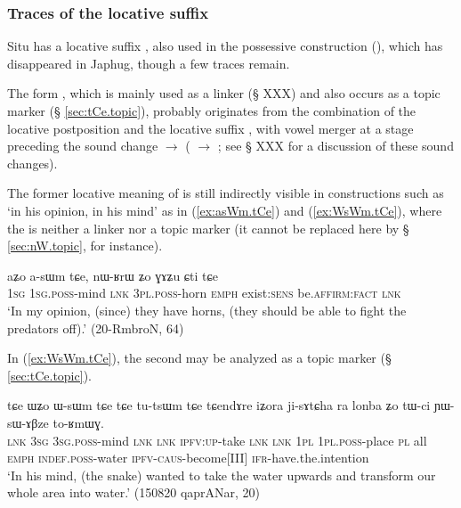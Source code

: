 \subsubsection{Traces of the locative suffix } \label{sec:locative.j}
Situ has a locative suffix , also used in the possessive construction (\citealt[325-330]{linxr93jiarongen}), which has disappeared in Japhug, though a few traces remain.


The form , which is mainly used as a linker (§ XXX) and also occurs as a topic marker (§ \ref{sec:tCe.topic}), probably originates from the combination of the locative postposition  and the locative suffix , with vowel merger at a stage preceding the sound change  $\rightarrow$   ( $\rightarrow$ ; see § XXX for a discussion of these sound changes).

The former locative meaning of  is still indirectly visible in constructions such as  `in his opinion, in his mind' as in (\ref{ex:asWm.tCe}) and (\ref{ex:WsWm.tCe}), where the  is neither a linker nor a topic marker (it cannot be replaced here by  § \ref{sec:nW.topic}, for instance). 

\begin{exe}
\ex \label{ex:asWm.tCe}
\gll aʑo a-sɯm tɕe, nɯ-ʁrɯ ʑo ɣɤʑu ɕti tɕe \\
\textsc{1sg} \textsc{1sg}.\textsc{poss}-mind \textsc{lnk} \textsc{3pl}.\textsc{poss}-horn \textsc{emph} exist:\textsc{sens} be.\textsc{affirm}:\textsc{fact} \textsc{lnk} \\
\glt `In my opinion, (since) they have horns, (they should be able to fight the predators off).' (20-RmbroN, 64)
\end{exe}

In (\ref{ex:WsWm.tCe}), the second  may be analyzed as a topic marker (§ \ref{sec:tCe.topic}).

\begin{exe}
\ex \label{ex:WsWm.tCe}
\gll 
tɕe ɯʑo ɯ-sɯm tɕe tɕe tu-tsɯm tɕe tɕendɤre iʑora ji-sɤtɕha ra lonba ʑo tɯ-ci ɲɯ-sɯ-ɤβze to-ʁmɯɣ. \\
\textsc{lnk} \textsc{3sg} \textsc{3sg}.\textsc{poss}-mind \textsc{lnk} \textsc{lnk} \textsc{ipfv}:\textsc{up}-take \textsc{lnk} \textsc{lnk} \textsc{1pl} \textsc{1pl}.\textsc{poss}-place \textsc{pl} all \textsc{emph} \textsc{indef}.\textsc{poss}-water \textsc{ipfv}-\textsc{caus}-become[III] \textsc{ifr}-have.the.intention \\
\glt `In his mind, (the snake) wanted to take the water upwards and transform our whole area into water.' (150820 qaprANar, 20)
\end{exe} 


